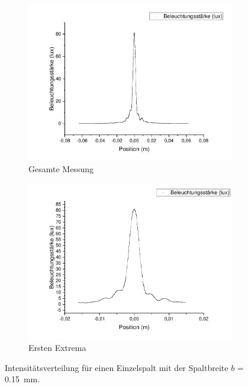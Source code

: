 \documentclass[
	a4paper,
	12pt,
	pagesize,
	ngerman
]{scrartcl}
\begin{document}
	\begin{figure}[H]
		\centering
		\begin{subfigure}{.5\textwidth}
			\centering
			\includegraphics[width=1\linewidth]{Einzelspalt0-150mm}
			\caption{Gesamte Messung}	
		\end{subfigure}%
		\begin{subfigure}{.5\textwidth}
			\centering
			\includegraphics[width=1\linewidth]{Einzelspalt0-150mmZOOM}
			\caption{Ersten Extrema}
		\end{subfigure}
		\label{Einzelspalt0-150mm}
		\caption{Intensitätsverteilung für einen Einzelspalt mit der Spaltbreite $b$ = \SI{0,15}{mm}.}
	\end{figure}	
\end{document}
